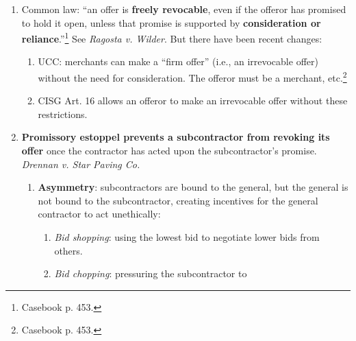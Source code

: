 \begin{enumerate}
\begin{enumerate}
\begin{enumerate}
            \item This rule frustrated the parties' expectations and defied 
            the interests of offerors as a class.\footnote{Casebook pp. 
            446--47.}
            \item So, the Restatement (First) drew a distinction between 
            \textbf{performing} and \textbf{preparing to perform}, which the 
            court followed in \emph{Ragosta v. Wilder}. But the distinction 
            can be hard to justify. For instance, say the unilateral offer is 
            that I'll give you \$1,000 to cross the Brooklyn Bridge. If you 
            take one step on the bridge, there is a contract. But if you spend 
            hours preparing, there is no contract.
        \end{enumerate}
        \item Common law: ``an offer is \textbf{freely revocable}, even if the 
        offeror has promised to hold it open, unless that promise is supported 
        by \textbf{consideration or reliance}.''\footnote{Casebook p. 453.} 
        See \emph{Ragosta v. Wilder}. But there have been recent changes:
        \begin{enumerate}
            \item UCC: merchants can make a ``firm offer'' (i.e., an 
            irrevocable offer) without the need for consideration. The offeror 
            must be a merchant, etc.\footnote{Casebook p. 453.}
            \item CISG Art. 16 allows an offeror to make an irrevocable offer 
            without these restrictions.
        \end{enumerate}
        \item \textbf{Promissory estoppel prevents a subcontractor from 
        revoking its offer} once the contractor has acted upon the 
        subcontractor's promise.  \emph{Drennan v. Star Paving Co.}
        \begin{enumerate}
            \item \textbf{Asymmetry}: subcontractors are bound to the general, 
            but the general is not bound to the subcontractor, creating 
            incentives for the general contractor to act unethically:
            \begin{enumerate}
                \item \emph{Bid shopping}: using the lowest bid to negotiate 
                lower bids from others.
                \item \emph{Bid chopping}: pressuring the subcontractor to 

\end{enumerate}
\end{enumerate}
\end{enumerate}
\end{enumerate}
